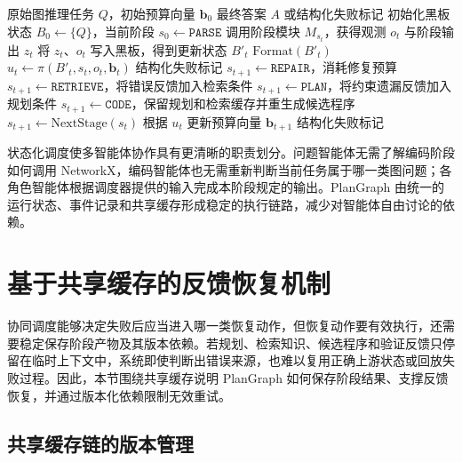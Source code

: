\begin{algorithm}[H]
\small
\caption{有界黑板调度算法}
\label{alg:blackboard_scheduler}
\begin{algorithmic}[1]
\Require 原始图推理任务 $Q$，初始预算向量 $\mathbf{b}_0$
\Ensure 最终答案 $A$ 或结构化失败标记
\State 初始化黑板状态 $B_0 \gets \{Q\}$，当前阶段 $s_0 \gets \texttt{PARSE}$
    \State 调用阶段模块 $M_{s_t}$，获得观测 $o_t$ 与阶段输出 $z_t$
    \State 将 $z_t$、$o_t$ 写入黑板，得到更新状态 $B'_t$
        \State \Return $\mathrm{Format}(B'_t)$
    \EndIf
    \State $u_t \gets \pi(B'_t,s_t,o_t,\mathbf{b}_t)$
        \State \Return 结构化失败标记
        \State $s_{t+1}\gets \texttt{REPAIR}$，消耗修复预算
        \State $s_{t+1}\gets \texttt{RETRIEVE}$，将错误反馈加入检索条件
        \State $s_{t+1}\gets \texttt{PLAN}$，将约束遗漏反馈加入规划条件
        \State $s_{t+1}\gets \texttt{CODE}$，保留规划和检索缓存并重生成候选程序
    \Else
        \State $s_{t+1}\gets \mathrm{NextStage}(s_t)$
    \EndIf
    \State 根据 $u_t$ 更新预算向量 $\mathbf{b}_{t+1}$
\EndFor
\State \Return 结构化失败标记
\end{algorithmic}
\end{algorithm}

状态化调度使多智能体协作具有更清晰的职责划分。问题智能体无需了解编码阶段如何调用 NetworkX，编码智能体也无需重新判断当前任务属于哪一类图问题；各角色智能体根据调度器提供的输入完成本阶段规定的输出。PlanGraph 由统一的运行状态、事件记录和共享缓存形成稳定的执行链路，减少对智能体自由讨论的依赖。

\section{基于共享缓存的反馈恢复机制}

协同调度能够决定失败后应当进入哪一类恢复动作，但恢复动作要有效执行，还需要稳定保存阶段产物及其版本依赖。若规划、检索知识、候选程序和验证反馈只停留在临时上下文中，系统即使判断出错误来源，也难以复用正确上游状态或回放失败过程。因此，本节围绕共享缓存说明 PlanGraph 如何保存阶段结果、支撑反馈恢复，并通过版本化依赖限制无效重试。

\subsection{共享缓存链的版本管理}

